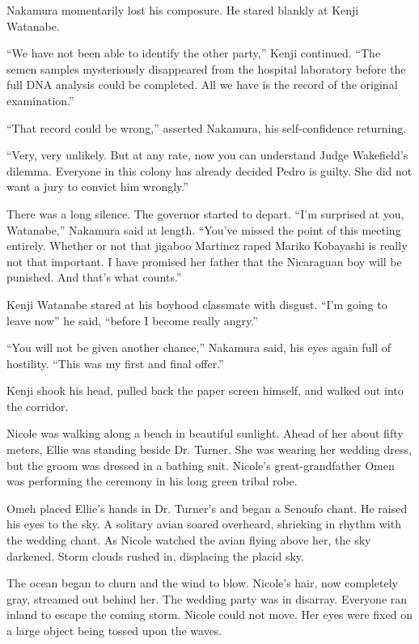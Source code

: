 \documentclass[]{article}
\begin{document}
{Nakamura momentarily lost his composure.  He stared blankly at Kenji Watanabe.

“We have not been able to identify the other party,” Kenji continued.  “The semen samples mysteriously disappeared from the hospital laboratory before the full DNA analysis could be completed.  All we have is the record of the original examination.”

“That record could be wrong,” asserted Nakamura, his self-confidence returning.

“Very, very unlikely.  But at any rate, now you can understand Judge Wakefield’s dilemma.  Everyone in this colony has already decided Pedro is guilty.  She did not want a jury to convict him wrongly.”

There was a long silence.  The governor started to depart.  “I’m surprised at you, Watanabe,” Nakamura said at length.  “You’ve missed the point of this meeting entirely.  Whether or not that jigaboo Martinez raped Mariko Kobayashi is really not that important.  I have promised her father that the Nicaraguan boy will be punished.  And that’s what counts.”

Kenji Watanabe stared at his boyhood classmate with disgust.  “I’m going to leave now” he said, “before I become really angry.”

“You will not be given another chance,” Nakamura said, his eyes again full of hostility.  “This was my first and final offer.”

Kenji shook his head, pulled back the paper screen himself, and walked out into the corridor.

Nicole was walking along a beach in beautiful sunlight.  Ahead of her about fifty meters, Ellie was standing beside Dr.  Turner.  She was wearing her wedding dress, but the groom was dressed in a bathing suit.  Nicole’s great-grandfather Omen was performing the ceremony in his long green tribal robe.

Omeh placed Ellie’s hands in Dr.  Turner’s and began a Senoufo chant.  He raised his eyes to the sky.  A solitary avian soared overheard, shrieking in rhythm with the wedding chant.  As Nicole watched the avian flying above her, the sky darkened.  Storm clouds rushed in, displacing the placid sky.

The ocean began to churn and the wind to blow.  Nicole’s hair, now completely gray, streamed out behind her.  The wedding party was in disarray.  Everyone ran inland to escape the coming storm.  Nicole could not move.  Her eyes were fixed on a large object being tossed upon the waves.

}
\end{document}
